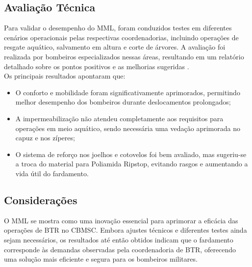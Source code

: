 \subsection{Avaliação Técnica}

Para validar o desempenho do \acrlong{MML}, foram conduzidos testes em diferentes cenários operacionais pelas respectivas coordenadorias, incluindo operações de resgate aquático, salvamento em altura e corte de árvores. A avaliação foi realizada por bombeiros especializados nessas áreas, resultando em um relatório detalhado sobre os pontos positivos e as melhorias sugeridas \cite{relMML}.
\\
Os principais resultados apontaram que:
\begin{itemize}
    \item O conforto e mobilidade foram significativamente aprimorados, permitindo melhor desempenho dos bombeiros durante deslocamentos prolongados;
    \item A impermeabilização não atendeu completamente aos requisitos para operações em meio aquático, sendo necessária uma vedação aprimorada no capuz e nos zíperes;
    \item O sistema de reforço nos joelhos e cotovelos foi bem avaliado, mas sugeriu-se a troca do material para Poliamida Ripstop, evitando rasgos e aumentando a vida útil do fardamento.
\end{itemize}

    

\subsection{Considerações}
O \acrlong{MML} se mostra como uma inovação essencial para aprimorar a eficácia das operações de \acrlong{BTR} no \acrshort{CBMSC}. Embora ajustes técnicos e diferentes testes ainda sejam necessários, os resultados até então obtidos indicam que o fardamento corresponde às demandas observadas pela coordenadoria de \acrshort{BTR}, oferecendo uma solução mais eficiente e segura para os bombeiros militares.